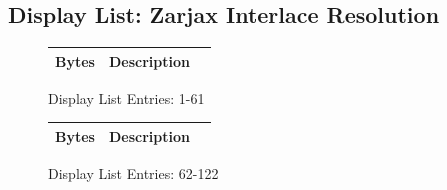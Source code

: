 \subsection*{Display List: Zarjax Interlace Resolution}
\vspace{-0.5cm}
\begin{minipage}[b]{0.31\linewidth}
  \begin{figure}[H]
    {
      \setlength{\tabcolsep}{3.0pt}
      \setlength\cmidrulewidth{\heavyrulewidth} %
      \begin{adjustbox}{height=8.5cm}

        \begin{tabular}{lll}
          \toprule
          Bytes       & Description                                                         \\
          \midrule
          
        \end{tabular}

      \end{adjustbox}

    }\caption*{Display List Entries: 1-61}
  \end{figure}
\end{minipage}
\hspace{0.1cm}
\begin{minipage}[b]{0.31\linewidth}
  \begin{figure}[H]
    {
      \setlength{\tabcolsep}{3.0pt}
      \setlength\cmidrulewidth{\heavyrulewidth} %
      \begin{adjustbox}{height=8.5cm}

        \begin{tabular}{lll}
          \toprule
          Bytes       & Description                                                         \\
          \midrule
        \end{tabular}

      \end{adjustbox}

    }\caption*{Display List Entries: 62-122}
  \end{figure}
\end{minipage}
\hspace{0.1cm}
